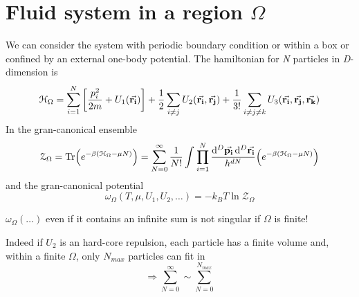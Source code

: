 \documentclass[../main/main.tex]{subfiles}
\begin{document}
\section{Fluid system in a region \( \Omega  \) }
We can consider the system with periodic boundary condition or within a box or confined by an external one-body potential. The hamiltonian for \emph{N} particles in \emph{D}-dimension is
\begin{equation}
  \mathcal{H}_ \Omega = \sum_{i=1}^{N} \qty[\frac{p_i^2}{2m} + U_1 (\va{r_i})] + \frac{1}{2} \sum_{i \neq j}^{} U_2 (\va{r_i}, \va{r_j}) + \frac{1}{3!} \sum_{i \neq j \neq k }^{}  U_3 (\va{r_i}, \va{r_j}, \va{r_k})
\end{equation}
In the gran-canonical ensemble
\begin{equation}
  \mathcal{Z}_ \Omega = \Tr(e^{-\beta (\mathcal{H}_ \Omega  - \mu N)} ) = \sum_{N=0}^{\infty } \frac{1}{N!} \int_{}^{} \prod_{i=1}^{N} \frac{\dd[D]{\va{p_i}} \dd[D]{\va{r_i}} }{h^{dN}} \qty(e^{-\beta (\mathcal{H}_ \Omega  - \mu N)} )
\end{equation}
and the gran-canonical potential
\begin{equation}
  \omega _ \Omega (T, \mu , U_1, U_2, \dots) = -k_B T \ln{\mathcal{Z}_ \Omega }
\end{equation}
\begin{remark}
\( \omega _ \Omega (\dots) \) even if it contains an infinite sum is not singular if \( \Omega  \) is finite!
\end{remark}
Indeed if \( U_2 \) is an hard-core repulsion, each particle has a finite volume and, within a finite \( \Omega  \), only \( N_{max} \) particles can fit in
\begin{equation}
  \Rightarrow \sum_{N=0}^{\infty } \sim \sum_{N=0}^{N_{max}}
\end{equation}
\end{document}
